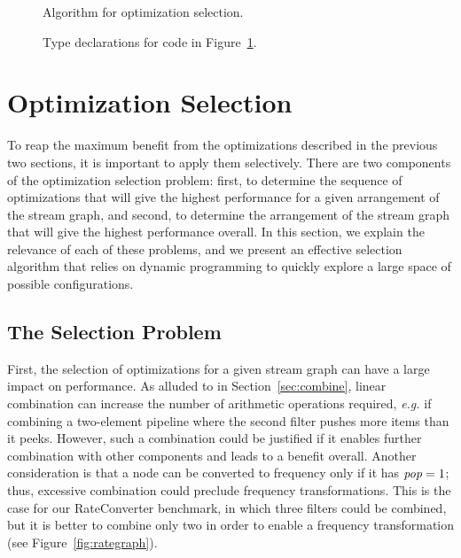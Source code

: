 \begin{figure}[t]
  \caption{Algorithm for optimization selection.
  \protect\label{fig:part-alg}}
\end{figure}

\begin{figure}[t]
  \caption{Type declarations for code in Figure~\ref{fig:part-alg}.
  \protect\label{fig:part-decl}}
\end{figure}


\section{Optimization Selection}
\label{sec:partitioning}

To reap the maximum benefit from the optimizations described in the
previous two sections, it is important to apply them selectively.
There are two components of the optimization selection problem: first,
to determine the sequence of optimizations that will give the highest
performance for a given arrangement of the stream graph, and second,
to determine the arrangement of the stream graph that will give the
highest performance overall.  In this section, we explain the
relevance of each of these problems, and we present an effective
selection algorithm that relies on dynamic programming to quickly
explore a large space of possible configurations.

\subsection{The Selection Problem}

First, the selection of optimizations for a given stream graph can
have a large impact on performance.  As alluded to in
Section~\ref{sec:combine}, linear combination can increase the number
of arithmetic operations required, {\it e.g.} if combining a
two-element pipeline where the second filter pushes more items than it
peeks.  However, such a combination could be justified if it enables
further combination with other components and leads to a benefit
overall.  Another consideration is that a node can be converted to
frequency only if it has $\mbox{\it pop}=1$; thus, excessive combination
could preclude frequency transformations.  This is the case for our
RateConverter benchmark, in which three filters could be combined, but
it is better to combine only two in order to enable a frequency
transformation (see Figure~\ref{fig:rategraph}).

